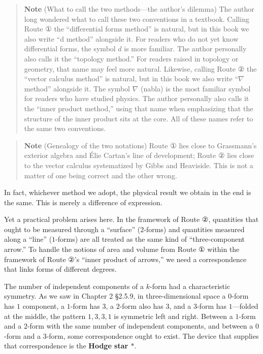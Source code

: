 \documentclass[a4paper,12pt,openany]{book}
\begin{document}
\begin{quote}
\textbf{Note} (What to call the two methods—the author's dilemma) The
author long wondered what to call these two conventions in a textbook.
Calling Route ① the ``differential forms method'' is natural, but in
this book we also write ``d method'' alongside it. For readers who do
not yet know differential forms, the symbol \(d\) is more familiar. The
author personally also calls it the ``topology method.'' For readers
raised in topology or geometry, that name may feel more natural.
Likewise, calling Route ② the ``vector calculus method'' is natural, but
in this book we also write ``\(\nabla\) method'' alongside it. The
symbol \(\nabla\) (nabla) is the most familiar symbol for readers who
have studied physics. The author personally also calls it the ``inner
product method,'' using that name when emphasizing that the structure of
the inner product sits at the core. All of these names refer to the same
two conventions.
\end{quote}

\begin{quote}
\textbf{Note} (Genealogy of the two notations) Route ① lies close to
Grassmann's exterior algebra and Élie Cartan's line of development;
Route ② lies close to the vector calculus systematized by Gibbs and
Heaviside. This is not a matter of one being correct and the other
wrong.
\end{quote}

In fact, whichever method we adopt, the physical result we obtain in the
end is the same. This is merely a difference of expression.

Yet a practical problem arises here. In the framework of Route ②,
quantities that ought to be measured through a ``surface'' (\(2\)-forms)
and quantities measured along a ``line'' (\(1\)-forms) are all treated
as the same kind of ``three-component arrow.'' To handle the notions of
area and volume from Route ① within the framework of Route ②'s ``inner
product of arrows,'' we need a correspondence that links forms of
different degrees.

The number of independent components of a \(k\)-form had a
characteristic symmetry. As we saw in Chapter 2 §2.5.9, in
three-dimensional space a \(0\)-form has \(1\) component, a \(1\)-form
has \(3\), a \(2\)-form also has \(3\), and a \(3\)-form has
\(1\)—folded at the middle, the pattern \(1, 3, 3, 1\) is symmetric
left and right. Between a \(1\)-form and a \(2\)-form with the same
number of independent components, and between a \(0\)-form and a
\(3\)-form, some correspondence ought to exist. The device that supplies
that correspondence is the \textbf{Hodge star $\ast$}.
\end{document}
